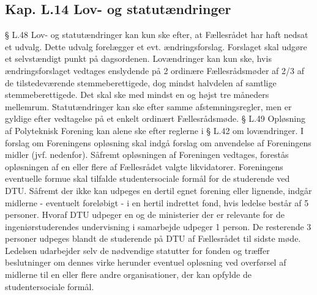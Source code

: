 \begin{list}
\subsection{Kap. L.14 Lov- og statutændringer}
§ L.48 Lov- og statutændringer kan kun ske efter, at Fællesrådet har haft nedsat et udvalg. Dette udvalg forelægger
           et evt. ændringsforslag. Forslaget skal udgøre et selvstændigt punkt på dagsordenen. Lovændringer kan kun
               ske, hvis ændringsforslaget vedtages enslydende på 2 ordinære Fællesrådsmøder af 2/3 af de tilstedeværende
                     stemmeberettigede, dog mindst halvdelen af samtlige stemmeberettigede. Det skal ske med mindst en og
                    højst tre måneders mellemrum. Statutændringer kan ske efter samme afstemningsregler, men er gyldige efter
                      vedtagelse på et enkelt ordinært Fællesrådsmøde.
§ L.49 Opløsning af Polyteknisk Forening kan alene ske efter reglerne i § L.42 om lovændringer. I forslag om
          Foreningens opløsning skal indgå forslag om anvendelse af Foreningens midler (jvf. nedenfor).
           Såfremt opløsningen af Foreningen vedtages, forestås opløsningen af en eller flere af Fællesrådet valgte
                likvidatorer.
               Foreningens eventuelle formue skal tilfalde studentersociale formål for de studerende ved DTU. Såfremt der
                ikke kan udpeges en dertil egnet forening eller lignende, indgår midlerne - eventuelt foreløbigt - i en hertil
                 indrettet fond, hvis ledelse består af 5 personer. Hvoraf DTU udpeger en og de ministerier der er relevante for
                 de ingeniørstuderendes undervisning i samarbejde udpeger 1 person. De resterende 3 personer udpeges blandt
                 de studerende på DTU af Fællesrådet til sidste møde. Ledelsen udarbejder selv de nødvendige statutter for
                     fonden og træffer beslutninger om dennes virke herunder eventuel opløsning ved overførsel af midlerne til en
                       eller flere andre organisationer, der kan opfylde de studentersociale formål.

\end{list}
